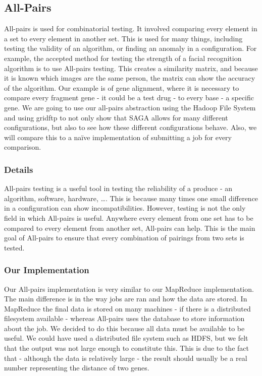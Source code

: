 \documentclass[conference,final]{IEEEtran}
\begin{document}
\subsection{All-Pairs}

All-pairs is used for combinatorial testing.  It involved comparing
every element in a set to every element in another set.  This is used
for many things, including testing the validity of an algorithm, or
finding an anomaly in a configuration.  For example, the accepted
method for testing the strength of a facial recognition algorithm is
to use All-pairs testing.  This creates a similarity matrix, and
because it is known which images are the same person, the matrix can
show the accuracy of the algorithm.  Our example is of gene alignment,
where it is necessary to compare every fragment gene - it could be a
test drug - to every base - a specific gene.  We are going to use our
all-pairs abstraction using the Hadoop File System and using gridftp
to not only show that SAGA allows for many different configurations,
but also to see how these different configurations behave.  Also, we
will compare this to a naïve implementation of submitting a job for
every comparison.

\subsubsection{Details}

All-pairs testing is a useful tool in testing the reliability of a
produce - an algorithm, software, hardware, \ldots.  This is because
many times one small difference in a configuration can show
incompatibilities.  However, testing is not the only field in which
All-pairs is useful.  Anywhere every element from one set has to be
compared to every element from another set, All-pairs can help.  This
is the main goal of All-pairs to ensure that every combination of
pairings from two sets is tested.

\subsubsection{Our Implementation}

Our All-pairs implementation is very similar to our MapReduce
implementation.  The main difference is in the way jobs are ran and
how the data are stored.  In MapReduce the final data is stored on
many machines - if there is a distributed filesystem available -
whereas All-pairs uses the database to store information about the
job.  We decided to do this because all data must be available to be
useful.  We could have used a distributed file system such as HDFS,
but we felt that the output was not large enough to constitute this.
This is due to the fact that - although the data is relatively large -
the result should usually be a real number representing the distance
of two genes.
\end{document}
